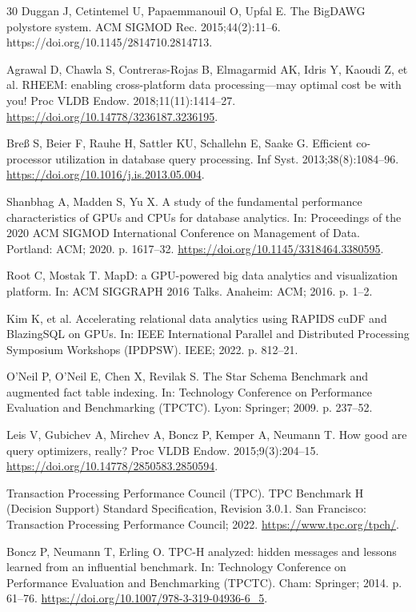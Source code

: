 \documentclass[10pt,a4paper]{article}
\begin{document}
\begin{thebibliography}{30}
Duggan J, Cetintemel U, Papaemmanouil O, Upfal E. The BigDAWG polystore system. ACM SIGMOD Rec. 2015;44(2):11--6. https://doi.org/10.1145/2814710.2814713.

Agrawal D, Chawla S, Contreras-Rojas B, Elmagarmid AK, Idris Y, Kaoudi Z, et al. RHEEM: enabling cross-platform data processing---may optimal cost be with you! Proc VLDB Endow. 2018;11(11):1414--27. \url{https://doi.org/10.14778/3236187.3236195}.

Bre{\ss} S, Beier F, Rauhe H, Sattler KU, Schallehn E, Saake G. Efficient co-processor utilization in database query processing. Inf Syst. 2013;38(8):1084--96. \url{https://doi.org/10.1016/j.is.2013.05.004}.


Shanbhag A, Madden S, Yu X. A study of the fundamental performance characteristics of GPUs and CPUs for database analytics. In: Proceedings of the 2020 ACM SIGMOD International Conference on Management of Data. Portland: ACM; 2020. p. 1617--32. \url{https://doi.org/10.1145/3318464.3380595}.

Root C, Mostak T. MapD: a GPU-powered big data analytics and visualization platform. In: ACM SIGGRAPH 2016 Talks. Anaheim: ACM; 2016. p. 1--2.

Kim K, et al. Accelerating relational data analytics using RAPIDS cuDF and BlazingSQL on GPUs. In: IEEE International Parallel and Distributed Processing Symposium Workshops (IPDPSW). IEEE; 2022. p. 812--21.

O'Neil P, O'Neil E, Chen X, Revilak S. The Star Schema Benchmark and augmented fact table indexing. In: Technology Conference on Performance Evaluation and Benchmarking (TPCTC). Lyon: Springer; 2009. p. 237--52.

Leis V, Gubichev A, Mirchev A, Boncz P, Kemper A, Neumann T. How good are query optimizers, really? Proc VLDB Endow. 2015;9(3):204--15. \url{https://doi.org/10.14778/2850583.2850594}.

Transaction Processing Performance Council (TPC). TPC Benchmark H (Decision Support) Standard Specification, Revision 3.0.1. San Francisco: Transaction Processing Performance Council; 2022. \url{https://www.tpc.org/tpch/}.

Boncz P, Neumann T, Erling O. TPC-H analyzed: hidden messages and lessons learned from an influential benchmark. In: Technology Conference on Performance Evaluation and Benchmarking (TPCTC). Cham: Springer; 2014. p. 61--76. \url{https://doi.org/10.1007/978-3-319-04936-6_5}.


\end{thebibliography}
\end{document}
